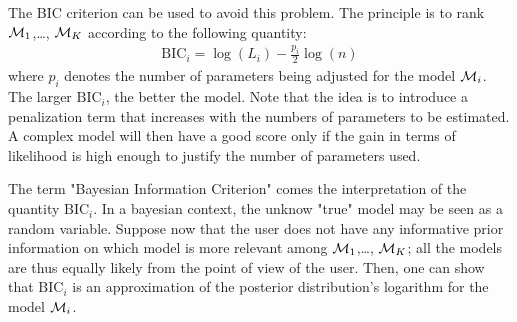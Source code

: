 {  The BIC criterion can be used to avoid this problem. The principle is to rank ${\mathcal M}_1$,\ldots, ${\mathcal M}_K$ according to the following quantity:
  \begin{align*}
    \textrm{BIC}_i = \log \left( L_i \right) - \frac{p_i}{2} \log(n)
  \end{align*}
  where $p_i$ denotes the number of parameters being adjusted for the model ${\mathcal M}_i$. The larger $\textrm{BIC}_i$, the better the model. Note that the idea is to introduce a penalization term that increases with the numbers of parameters to be estimated. A complex model will then have a good score only if the gain in terms of likelihood is high enough to justify the number of parameters used.

  The term "Bayesian Information Criterion" comes the interpretation of the quantity $\textrm{BIC}_i$. In a bayesian context, the unknow "true" model may be seen as a random variable. Suppose now that the user does not have any informative prior information on which model is more relevant among ${\mathcal M}_1$,\ldots, ${\mathcal M}_K$; all the models are thus equally likely from the point of view of the user. Then, one can show that $\textrm{BIC}_i$ is an approximation of the posterior distribution's logarithm for the model ${\mathcal M}_i$.
}
{

}


